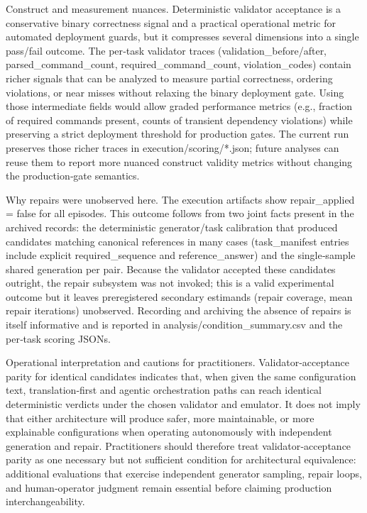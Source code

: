 \documentclass[conference]{IEEEtran}
\begin{document}
Construct and measurement nuances. Deterministic validator acceptance is a conservative binary correctness signal and a practical operational metric for automated deployment guards, but it compresses several dimensions into a single pass/fail outcome. The per‑task validator traces (validation\_before/after, parsed\_command\_count, required\_command\_count, violation\_codes) contain richer signals that can be analyzed to measure partial correctness, ordering violations, or near misses without relaxing the binary deployment gate. Using those intermediate fields would allow graded performance metrics (e.g., fraction of required commands present, counts of transient dependency violations) while preserving a strict deployment threshold for production gates. The current run preserves those richer traces in execution/scoring/*.json; future analyses can reuse them to report more nuanced construct validity metrics without changing the production‑gate semantics.

Why repairs were unobserved here. The execution artifacts show repair\_applied = false for all episodes. This outcome follows from two joint facts present in the archived records: the deterministic generator/task calibration that produced candidates matching canonical references in many cases (task\_manifest entries include explicit required\_sequence and reference\_answer) and the single‑sample shared generation per pair. Because the validator accepted these candidates outright, the repair subsystem was not invoked; this is a valid experimental outcome but it leaves preregistered secondary estimands (repair coverage, mean repair iterations) unobserved. Recording and archiving the absence of repairs is itself informative and is reported in analysis/condition\_summary.csv and the per‑task scoring JSONs.

Operational interpretation and cautions for practitioners. Validator‑acceptance parity for identical candidates indicates that, when given the same configuration text, translation‑first and agentic orchestration paths can reach identical deterministic verdicts under the chosen validator and emulator. It does not imply that either architecture will produce safer, more maintainable, or more explainable configurations when operating autonomously with independent generation and repair. Practitioners should therefore treat validator‑acceptance parity as one necessary but not sufficient condition for architectural equivalence: additional evaluations that exercise independent generator sampling, repair loops, and human‑operator judgment remain essential before claiming production interchangeability.
\end{document}
